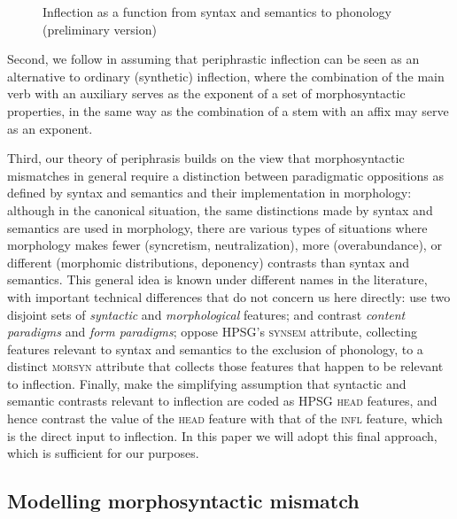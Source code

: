 \documentclass[output=paper]{langsci/langscibook}
\begin{document}
\begin{figure}
\caption{Inflection as a function from syntax and semantics to phonology (preliminary version)\label{fig:infl:prelim}}
\end{figure}

Second, we follow \citet{Ackerman98,Sadler01,Ackerman04} in assuming  that periphrastic inflection can be seen as an alternative to ordinary (synthetic) inflection, where the combination of the main verb with an auxiliary serves as the exponent of a set of morphosyntactic properties, in the same way as the combination of a stem with an affix may serve as an exponent. 

Third, our theory of periphrasis builds on the view that morphosyntactic mismatches in general require a distinction between paradigmatic oppositions as defined by syntax and semantics and their implementation in morphology: although in the canonical situation, the same distinctions made by syntax and semantics are used in morphology, there are various types of situations where morphology makes fewer (syncretism, neutralization), more (overabundance), or different (morphomic distributions, deponency) contrasts than syntax and semantics. This general idea is known under different names in the literature, with important technical differences that do not concern us here directly: \citet{Sadler01} use two disjoint sets of \emph{syntactic} and \emph{morphological} features; \citet{Ackerman04} and \citet{Stump06,Stump16} contrast \emph{content paradigms} and \emph{form paradigms}; \citet{Bonami15} oppose HPSG's \textsc{synsem} attribute, collecting features relevant to syntax and semantics to the exclusion of phonology, to a distinct \textsc{morsyn} attribute that collects those features that happen to be relevant to inflection. Finally, \citet{Bonami14d,Bonami16b} make the simplifying assumption that syntactic and semantic contrasts relevant to inflection are coded as HPSG \textsc{head} features, and hence contrast the value of the \textsc{head} feature with that of the \textsc{infl} feature, which is the direct input to inflection. In this paper we will adopt this final approach, which is sufficient for our purposes. 

\subsection{Modelling morphosyntactic mismatch}
\end{document}
